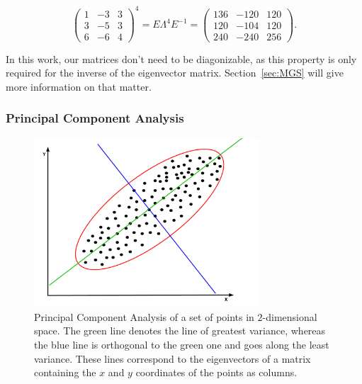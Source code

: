 \begin{equation}
  \begin{pmatrix}
    1 & {-3} & 3\\
    3 & {-5} & 3\\
    6 & {-6} & 4
  \end{pmatrix}
  ^4
  =
  E
  \Lambda^4
  E^{-1}
  =
  \begin{pmatrix}
    136 & {-120} & 120\\
    120 & {-104} & 120\\
    240 & {-240} & 256
  \end{pmatrix}
  .
\end{equation}

\noindent In this work, our matrices don't need to be diagonizable, as
this property is only required for the inverse of the eigenvector
matrix. Section~\ref{sec:MGS} will give more information on that matter.


\subsubsection{Principal Component Analysis}

\begin{figure}[t]
  \centering
  \includegraphics[width=0.75\textwidth]{Images/PCA.pdf}
  \caption{Principal Component Analysis of a set of points in
  $2$-dimensional space. The green line denotes the line of greatest
  variance, whereas the blue line is orthogonal to the green one and
  goes along the least variance. These lines correspond to the
  eigenvectors of a matrix containing the $x$ and $y$ coordinates of the
  points as columns.}
  \label{fig:PCA}
\end{figure}

